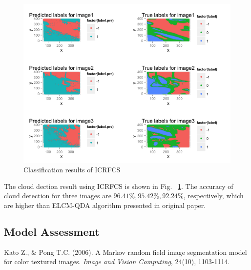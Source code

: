 \documentclass[english]{article}\usepackage{graphicx, color}
\numberwithin{equation}{section}
\numberwithin{figure}{section}
\begin{document}
\begin{figure}[!h]
  \begin{center}
    \includegraphics[width=\columnwidth]{figures/CRF.png}
  \end{center}
  \caption{Classification results of ICRFCS}
  \label{fig:ICRFCS}
\end{figure}

The cloud dection result using ICRFCS is shown in Fig. ~\ref{fig:ICRFCS}. The 
accuracy of cloud detection for three images are $96.41\%, 95.42\%, 92.24\%$, 
respectively, which are higher than ELCM-QDA algorithm presented in original 
paper.

\subsection{Model Assessment}



\begin{thebibliography}{9}

  Kato Z., \& Pong T.C. (2006).
  A Markov random field image segmentation model for color textured images.
  \emph{Image and Vision Computing}, 24(10), 1103-1114.

\end{thebibliography}
\end{document}
